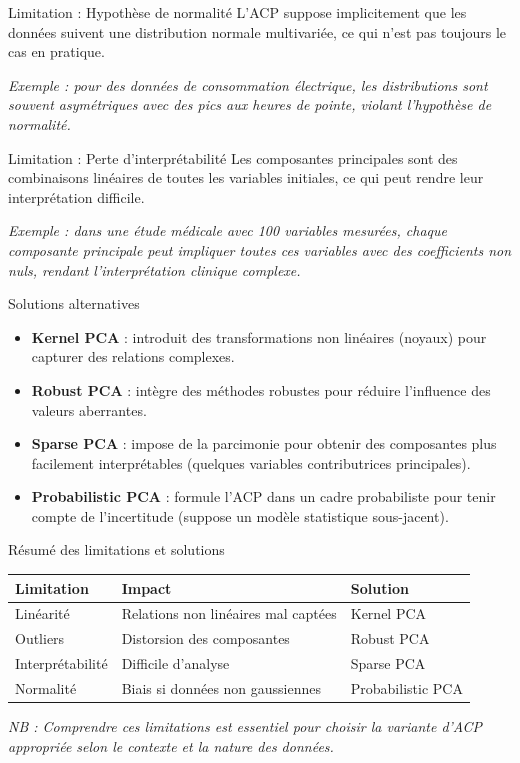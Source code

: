 \documentclass{beamer}
\begin{document}
\begin{frame}{Limitation : Hypothèse de normalité}
L'ACP suppose implicitement que les données suivent une distribution normale multivariée, ce qui n'est pas toujours le cas en pratique.

\textit{Exemple : pour des données de consommation électrique, les distributions sont souvent asymétriques avec des pics aux heures de pointe, violant l'hypothèse de normalité.}
\end{frame}

\begin{frame}{Limitation : Perte d'interprétabilité}
Les composantes principales sont des combinaisons linéaires de toutes les variables initiales, ce qui peut rendre leur interprétation difficile.

\textit{Exemple : dans une étude médicale avec 100 variables mesurées, chaque composante principale peut impliquer toutes ces variables avec des coefficients non nuls, rendant l'interprétation clinique complexe.}
\end{frame}

\begin{frame}{Solutions alternatives}
\begin{itemize}
    \item \textbf{Kernel PCA} : introduit des transformations non linéaires (noyaux) pour capturer des relations complexes.
    \item \textbf{Robust PCA} : intègre des méthodes robustes pour réduire l'influence des valeurs aberrantes.
    \item \textbf{Sparse PCA} : impose de la parcimonie pour obtenir des composantes plus facilement interprétables (quelques variables contributrices principales).
    \item \textbf{Probabilistic PCA} : formule l'ACP dans un cadre probabiliste pour tenir compte de l'incertitude (suppose un modèle statistique sous-jacent).
\end{itemize}
\end{frame}

\begin{frame}{Résumé des limitations et solutions}
\footnotesize
\begin{center}
\begin{tabular}{|l|l|l|}
\hline
\textbf{Limitation} & \textbf{Impact} & \textbf{Solution} \\
\hline
Linéarité & Relations non linéaires mal captées & Kernel PCA \\
\hline
Outliers & Distorsion des composantes & Robust PCA \\
\hline
Interprétabilité & Difficile d'analyse & Sparse PCA \\
\hline
Normalité & Biais si données non gaussiennes & Probabilistic PCA \\
\hline
\end{tabular}
\end{center}

\vspace{0.2cm}
\scriptsize{\textit{NB : Comprendre ces limitations est essentiel pour choisir la variante d'ACP appropriée selon le contexte et la nature des données.}}
\end{frame}
\end{document}
